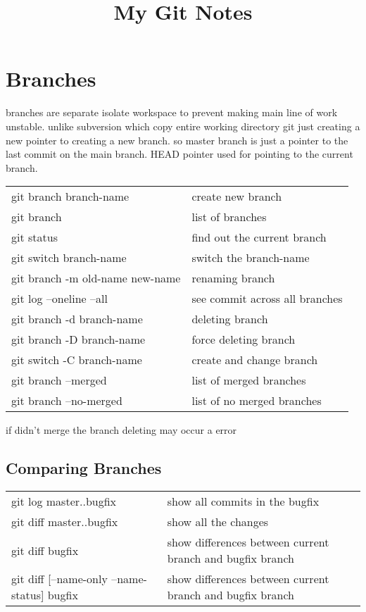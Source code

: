 \documentclass{article}
\begin{document}
	\title{My Git Notes}
	\maketitle
	\newpage
	\tableofcontents
	\newpage
	\section{Branches}
	
		branches are separate isolate workspace to prevent making main line of work unstable.
		unlike subversion which copy entire working directory git just creating a new pointer to creating a new branch. 
		so master branch is just a pointer to the last commit on the main branch.
		HEAD pointer used for pointing to the current branch.
	
		\begin{tabular}{l l}
			git  branch branch-name          & create new branch              \\
			git  branch                      & list of branches               \\
			git  status                      & find out the current branch    \\
			git  switch branch-name          & switch the branch-name         \\
			git  branch -m old-name new-name & renaming branch                \\
			git  log --oneline --all         & see commit across all branches \\
			git  branch -d branch-name       & deleting branch                \\
			git  branch -D branch-name       & force deleting branch          \\
			git switch -C branch-name        & create and change branch       \\
			git branch --merged              & list of merged branches        \\
			git branch --no-merged           & list of no merged branches
		\end{tabular}

		if didn't merge the branch deleting may occur a error
		
	\subsection{Comparing Branches}
		\begin{tabular}{l l}
			git log master..bugfix                      & show all commits in the bugfix                            \\
			git diff master..bugfix                     & show all the changes                                      \\
			git diff bugfix                             & show differences between current branch and bugfix branch \\
			git diff [--name-only --name-status] bugfix & show differences between current branch and bugfix branch
		\end{tabular}
	
\end{document}
